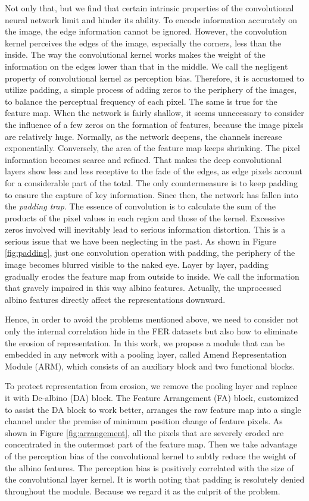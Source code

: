 \documentclass[10pt,twocolumn,letterpaper]{article}
\begin{document}
	Not only that, but we find that certain intrinsic properties of the convolutional neural network limit and hinder its ability. To encode information accurately on the image, the edge information cannot be ignored. However, the convolution kernel perceives the edges of the image, especially the corners, less than the inside. The way the convolutional kernel works makes the weight of the information on the edges lower than that in the middle. We call the negligent property of convolutional kernel as perception bias. Therefore, it is accustomed to utilize padding, a simple process of adding zeros to the periphery of the images, to balance the perceptual frequency of each pixel. The same is true for the feature map. When the network is fairly shallow, it seems unnecessary to consider the influence of a few zeros on the formation of features, because the image pixels are relatively huge. Normally, as the network deepens, the channels increase exponentially. Conversely, the area of the feature map keeps shrinking. The pixel information becomes scarce and refined. That makes the deep convolutional layers show less and less receptive to the fade of the edges, as edge pixels account for a considerable part of the total. The only countermeasure is to keep padding to ensure the capture of key information. Since then, the network has fallen into the \emph{padding trap}. The essence of convolution is to calculate the sum of the products of the pixel values in each region and those of the kernel. Excessive zeros involved will inevitably lead to serious information distortion. This is a serious issue that we have been neglecting in the past. As shown in Figure \ref{fig:padding}, just one convolution operation with padding, the periphery of the image becomes blurred visible to the naked eye. Layer by layer, padding gradually erodes the feature map from outside to inside. We call the information that gravely impaired in this way albino features. Actually, the unprocessed albino features directly affect the representations downward.

	Hence, in order to avoid the problems mentioned above, we need to consider not only the internal correlation hide in the FER datasets but also how to eliminate the erosion of representation. In this work, we propose a module that can be embedded in any network with a pooling layer, called Amend Representation Module (ARM), which consists of an auxiliary block and two functional blocks. 

	To protect representation from erosion, we remove the pooling layer and replace it with De-albino (DA) block. The Feature Arrangement (FA) block, customized to assist the DA block to work better, arranges the raw feature map into a single channel under the premise of minimum position change of feature pixels. As shown in Figure \ref{fig:arrangement}, all the pixels that are severely eroded are concentrated in the outermost part of the feature map. Then we take advantage of the perception bias of the convolutional kernel to subtly reduce the weight of the albino features. The perception bias is positively correlated with the size of the convolutional layer kernel. It is worth noting that padding is resolutely denied throughout the module. Because we regard it as the culprit of the problem. 
\end{document}
